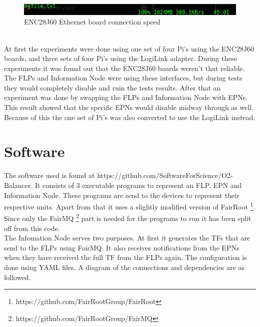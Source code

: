 \begin{figure}[htb]
	\includegraphics[width=\textwidth]{./graphics/gpio_ethernet_speed.jpg}
	\caption{ENC28J60 Ethernet board connection speed}
\end{figure}

~\\ At first the experiments were done using one set of four Pi's using the ENC28J60 boards, and three sets of four Pi's using the LogiLink adapter. During these experiments it was found out that the ENC28J60 boards weren't that reliable. The FLPs and Information Node were using these interfaces, but during tests they would completely disable and ruin the tests results. After that an experiment was done by swapping the FLPs and Information Node with EPNs. This result showed that the specific EPNs would disable midway through as well. Because of this the one set of Pi's was also converted to use the LogiLink instead.

\section{Software}
The software used is found at https://github.com/SoftwareForScience/O2-Balancer. It consists of 3 executable programs to represent an FLP, EPN and Information Node. These programs are send to the devices to represent their respective units. Apart from that it uses a slightly modified version of FairRoot
\footnote{https://github.com/FairRootGroup/FairRoot}. 
Since only the FairMQ
\footnote{https://github.com/FairRootGroup/FairMQ}
 part is needed for the programs to run it has been split off from this code.\\
The Infomation Node serves two purposes. At first it generates the TFs that are send to the FLPs using FairMQ. It also receives notifications from the EPNs when they have received the full TF from the FLPs again. The configuration is done using YAML files. A diagram of the connections and dependencies are as followed.

